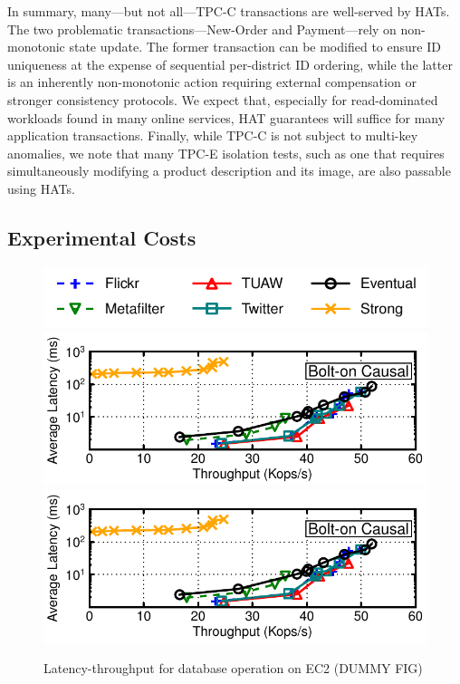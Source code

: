 In summary, many---but not all---TPC-C transactions are well-served by
HATs. The two problematic transactions---New-Order and Payment---rely
on non-monotonic state update. The former transaction can be modified
to ensure ID uniqueness at the expense of sequential per-district ID
ordering, while the latter is an inherently non-monotonic action
requiring external compensation or stronger consistency protocols. We
expect that, especially for read-dominated workloads found in many
online services, HAT guarantees will suffice for many application
transactions. Finally, while TPC-C is not subject to multi-key
anomalies, we note that many TPC-E isolation tests, such as one that
requires simultaneously modifying a product description and its image,
are also passable using HATs.

\subsection{Experimental Costs}

\begin{figure}
\includegraphics[width=.8\columnwidth]{figs/macrotracelegend.pdf}\vspace{-2mm}
\includegraphics[width=\columnwidth]{figs/lat-thru-trace-K0-SCALEMACRO.pdf}
\includegraphics[width=\columnwidth]{figs/lat-thru-trace-K0-SCALEMACRO.pdf}
\caption{Latency-throughput for database operation on EC2 (DUMMY FIG)}
\label{fig:wan-exp}
\end{figure}

